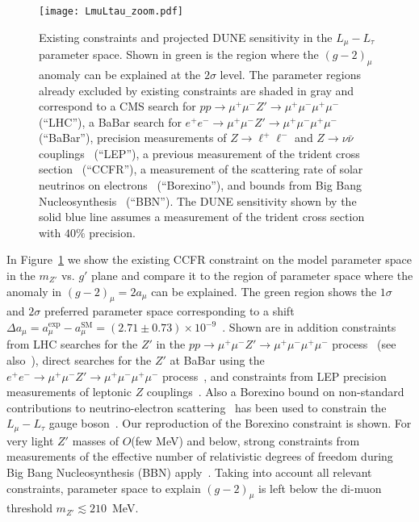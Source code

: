 \begin{figure}[tb!] \centering
\texttt{[image: LmuLtau\_zoom.pdf]}
\caption[Existing constraints and projected sensitivity in the $L_\mu - L_\tau$ parameter space]{Existing constraints and projected DUNE sensitivity in the $L_\mu - L_\tau$ parameter space. Shown in green is the region where the $(g-2)_\mu$ anomaly can be explained at the $2\sigma$ level. The parameter regions already excluded by existing constraints are shaded in gray and correspond to a CMS search for $pp \to \mu^+\mu^- Z' \to \mu^+\mu^-\mu^+\mu^-$~\cite{Sirunyan:2018nnz} (``LHC''), a BaBar search for $e^+e^- \to \mu^+\mu^- Z' \to \mu^+\mu^-\mu^+\mu^-$~\cite{TheBABAR:2016rlg} (``BaBar''), precision measurements of $Z \to \ell^+ \ell^-$ and $Z \to \nu\bar\nu$ couplings~\cite{ALEPH:2005ab,Altmannshofer:2014cfa} (``LEP''), a previous measurement of the trident cross section~\cite{Mishra:1991bv,Altmannshofer:2014pba} (``CCFR''), a measurement of the scattering rate of solar neutrinos on electrons~\cite{Bellini:2011rx,Harnik:2012ni,Agostini:2017ixy} (``Borexino''), and bounds from Big Bang Nucleosynthesis~\cite{Ahlgren:2013wba,Kamada:2015era} (``BBN''). The DUNE sensitivity shown by the solid blue line assumes a measurement of the trident cross section with $40\%$ precision.}
\label{fig:LmuLtau}
\end{figure}

In Figure~\ref{fig:LmuLtau} we show the existing CCFR constraint on the model parameter space in the $m_{Z'}$ vs. $g'$ plane and compare it to the region of parameter space where the anomaly in $(g-2)_\mu = 2 a_\mu$ can be explained. The green region shows the $1\sigma$ and $2\sigma$ preferred parameter space corresponding to a shift $\Delta a_\mu = a_\mu^\text{exp}-a_\mu^\text{SM} = (2.71 \pm 0.73) \times 10^{-9}$~\cite{Keshavarzi:2018mgv}.
Shown are in addition constraints from LHC searches for the $Z'$ in the $pp \to \mu^+\mu^- Z' \to \mu^+\mu^-\mu^+\mu^-$ process~\cite{Sirunyan:2018nnz} (see also~\cite{Altmannshofer:2014pba}), direct searches for the $Z'$ at BaBar using the $e^+e^- \to \mu^+\mu^- Z' \to \mu^+\mu^-\mu^+\mu^-$ process~\cite{TheBABAR:2016rlg}, and constraints from LEP precision measurements of leptonic $Z$ couplings~\cite{ALEPH:2005ab,Altmannshofer:2014cfa}.  
Also a Borexino bound on non-standard contributions to neutrino-electron scattering~\cite{Harnik:2012ni,Bellini:2011rx,Agostini:2017ixy} has been used to constrain the $L_\mu - L_\tau$ gauge boson~\cite{Kamada:2015era,Araki:2015mya,Kamada:2018zxi}. Our reproduction of the Borexino constraint is shown. 
For very light $Z'$ masses of $O$(few MeV) and below, strong constraints from measurements of the effective number of relativistic degrees of freedom during Big Bang Nucleosynthesis (BBN) apply~\cite{Ahlgren:2013wba,Kamada:2015era}.
Taking into account all relevant constraints, parameter space to explain $(g-2)_\mu$ is left below the di-muon threshold $m_{Z'} \lesssim 210$~MeV.

